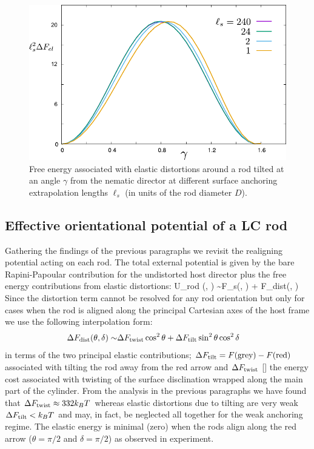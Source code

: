\begin{figure}
	\includegraphics[width = .7\columnwidth]{figures/chapter-4/fel}
	\caption{Free energy associated with elastic distortions around a rod tilted at an angle $\gamma$ from the nematic director at different surface anchoring extrapolation lengths $\ell_{s}$ (in units of the rod diameter $D$). }
	\label{fel}
\end{figure}



\subsection{Effective orientational potential of a LC rod}

Gathering the findings of the previous paragraphs we revisit the realigning potential acting on each rod. The total external potential is given by the bare Rapini-Papoular contribution  for the undistorted host director plus the free energy contributions from elastic distortions:
\beq
U_{\rm rod} (\theta, \delta) \sim  F_{s}(\theta, \delta)  + \Delta F_{\rm dist}(\theta, \delta)
\eeq
Since the distortion term cannot be resolved for any rod orientation but only for cases when the rod is aligned along the principal Cartesian axes of the host frame we use the following interpolation form:
\begin{align}
\Delta F_{\rm dist} (\theta, \delta)  \sim & \Delta F_{\rm twist} \cos^{2} \theta  + \Delta F_{\rm tilt} \sin^{2} \theta \cos^{2} \delta
\end{align}
in terms of the two principal elastic  contributions;  $\Delta F_{\rm tilt} = F(\textrm{grey}) - F(\textrm{red})$ associated with tilting  the rod away from the red arrow and $\Delta F_{\rm twist}$ [] the energy cost associated with twisting of the surface disclination wrapped along the main part of the cylinder. From the analysis in the previous paragraphs we have found that $\Delta F_{\rm twist} \approx 332 k_{B}T$ whereas elastic distortions due to tilting are very weak $\Delta F_{\rm tilt} < k_{B}T$ and may, in fact, be neglected all together for the weak anchoring regime.  The  elastic energy is minimal (zero) when the rods align along the red arrow ($\theta = \pi/2$ and $ \delta= \pi/2 $) as observed in experiment.

